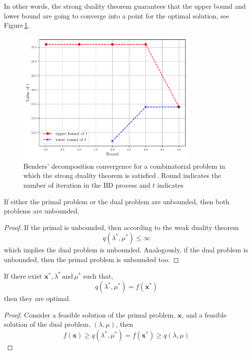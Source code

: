 In other words, the strong duality theorem guarantees that the upper bound and lower bound are going to converge into a point for the optimal solution, see Figure\,\ref{fig:BD_Convergence}.
\begin{figure}[H]
\centering
\includegraphics[width=0.8\textwidth]{Figures/BD_Convergence.pdf} 
\caption{Benders' decomposition convergence for a combinatorial problem in which the strong duality theorem is satisfied\,\cite{Zhao2021HybridProgramming}. Round indicates the number of iteration in the BD process and $t$ indicates}
\label{fig:BD_Convergence}
\end{figure}
\begin{corollary}{}{}
If either the primal problem or the dual problem are unbounded, then both problems are unbounded.
\end{corollary}
\begin{proof}
If the primal is unbounded, then according to the weak duality theorem
\begin{equation}
    q(\lambda^{*}, \mu^{*}) \leq \infty
\end{equation}
which implies the dual problem is unbounded. Analogously, if the dual problem is unbounded, then the primal problem is unbounded too.
\end{proof}
\begin{corollary}{}{}
If there exist $\mathbf{x}^{*},\lambda^{*}\,\text{and}\, \mu^{*}$ such that,
\begin{equation}
    q(\lambda^{*}, \mu^{*}) = f(\mathbf{x}^{*})
\end{equation}
then they are optimal.
\end{corollary}
\begin{proof}
Consider a feasible solution of the primal problem, $\mathbf{x}$, and a feasible solution of the dual problem, $(\lambda, \mu)$, then
\begin{equation}
    f(\mathbf{x}) \geq q(\lambda^{*}, \mu^{*}) = f(\mathbf{x}^{*}) \geq q(\lambda, \mu)
\end{equation}
\end{proof}
